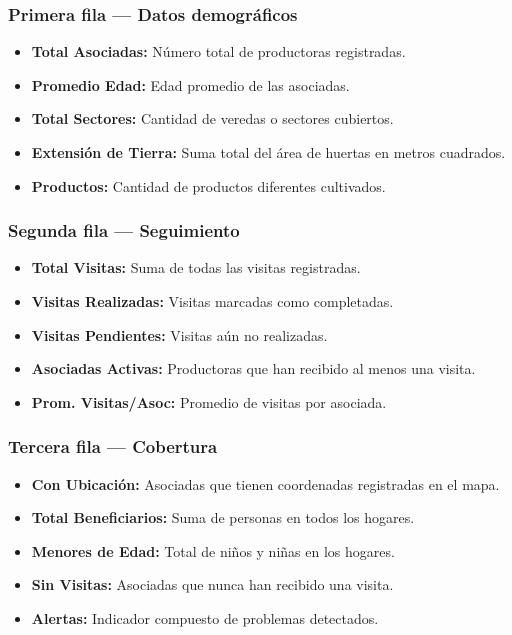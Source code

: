 \documentclass[12pt]{article}
\begin{document}
\subsubsection{Primera fila --- Datos demográficos}
\begin{itemize}[nosep]
  \item \textbf{Total Asociadas:} Número total de productoras registradas.
  \item \textbf{Promedio Edad:} Edad promedio de las asociadas.
  \item \textbf{Total Sectores:} Cantidad de veredas o sectores cubiertos.
  \item \textbf{Extensión de Tierra:} Suma total del área de huertas en metros cuadrados.
  \item \textbf{Productos:} Cantidad de productos diferentes cultivados.
\end{itemize}

\subsubsection{Segunda fila --- Seguimiento}
\begin{itemize}[nosep]
  \item \textbf{Total Visitas:} Suma de todas las visitas registradas.
  \item \textbf{Visitas Realizadas:} Visitas marcadas como completadas.
  \item \textbf{Visitas Pendientes:} Visitas aún no realizadas.
  \item \textbf{Asociadas Activas:} Productoras que han recibido al menos una visita.
  \item \textbf{Prom. Visitas/Asoc:} Promedio de visitas por asociada.
\end{itemize}

\subsubsection{Tercera fila --- Cobertura}
\begin{itemize}[nosep]
  \item \textbf{Con Ubicación:} Asociadas que tienen coordenadas registradas en el mapa.
  \item \textbf{Total Beneficiarios:} Suma de personas en todos los hogares.
  \item \textbf{Menores de Edad:} Total de niños y niñas en los hogares.
  \item \textbf{Sin Visitas:} Asociadas que nunca han recibido una visita.
  \item \textbf{Alertas:} Indicador compuesto de problemas detectados.
\end{itemize}
\end{document}
